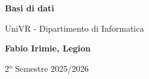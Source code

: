 \begin{titlepage}
	\begin{center}
		\vspace*{1cm}

		\Huge
		\textbf{Basi di dati}

		\vspace{0.5cm}
		\LARGE
		UniVR - Dipartimento di Informatica

		\vspace{1.5cm}

		\textbf{Fabio Irimie, Legion}

		\vfill


		\vspace{0.8cm}


		2° Semestre 2025/2026

	\end{center}
\end{titlepage}
